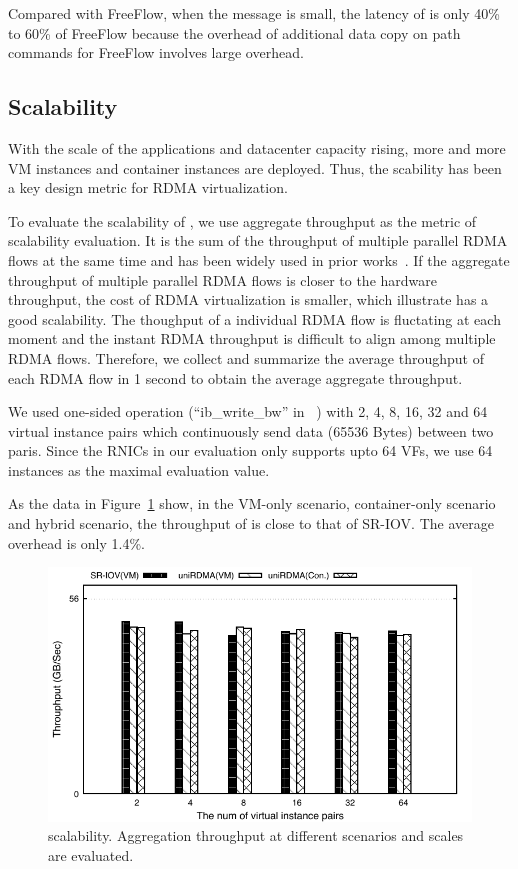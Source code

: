 Compared with FreeFlow, when the message is small, the latency of \sys is only 40\% to 60\% of FreeFlow because the overhead of additional data copy on path commands for FreeFlow involves large overhead. 





\subsection{Scalability}

With the scale of the applications and datacenter capacity rising, more and more VM instances and container instances are deployed. Thus, the scability has been a key design metric for RDMA virtualization.

To evaluate the scalability of \sys, we use aggregate throughput as the metric of scalability evaluation. It is the sum of the throughput of multiple parallel RDMA flows at the same time and has been widely used in prior works~\cite{kim2019freeflow, pfefferle2015hybrid, he2020masq}. If the aggregate throughput of multiple parallel RDMA flows is closer to the hardware throughput, the cost of RDMA virtualization is smaller, which illustrate \sys has a good scalability. The thoughput of a individual RDMA flow is fluctating at each moment and the instant RDMA throughput is difficult to align among multiple RDMA flows. Therefore, we collect and summarize the average throughput of each RDMA flow in 1 second to obtain the average aggregate throughput.

We used one-sided operation (``ib\_write\_bw'' in ~\cite{perftest}) with 2, 4, 8, 16, 32 and 64 virtual instance pairs which continuously send data (65536 Bytes) between two paris. Since the RNICs in our evaluation only supports upto 64 VFs, we use 64 instances as the maximal evaluation value.

As the data in Figure~\ref{fig:scabality} show, in the VM-only scenario, container-only scenario and hybrid scenario, the throughput of \sys is close to that of SR-IOV. The average overhead is only 1.4\%.


\begin{figure}[!ht]
	\centering
	\includegraphics[width=1.0\linewidth]{images/scabality.pdf}
	\caption{\sys scalability. Aggregation throughput at different scenarios and scales are evaluated.}
	\label{fig:scabality}
\end{figure}

